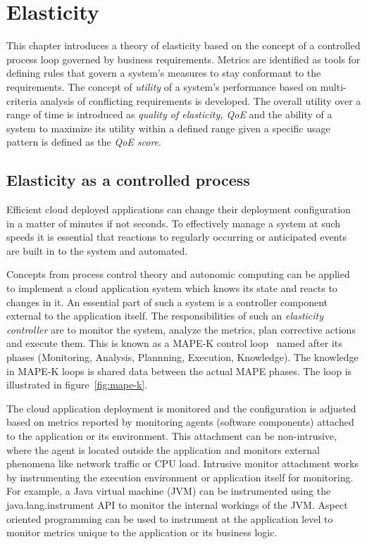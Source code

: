 \documentclass[english]{tktltiki2}
\theoremstyle{definition}
\theoremstyle{remark}
\begin{document}
\section{Elasticity}  
\label{sec:elasticity}

This chapter introduces a theory of elasticity based on the concept of a
controlled process loop governed by business requirements. Metrics are
identified as tools for defining rules that govern a system's measures to stay
conformant to the requirements. The concept of \textit{utility} of a system's
performance based on multi-criteria analysis of conflicting requirements is
developed. The overall utility over a range of time is introduced as
\textit{quality of elasticity, QoE} and the ability of a system to maximize its
utility within a defined range given a specific usage pattern is defined as the
\textit{QoE score}.

\subsection{Elasticity as a controlled process}
\label{sec:elasticity_as_a_controlled_process}

Efficient cloud deployed applications can change their deployment configuration in a matter of minutes if not seconds. To effectively manage a system at such speeds it
is essential that reactions to regularly occurring or anticipated events are
built in to the system and automated.

Concepts from process control theory and autonomic computing can be applied to
implement a cloud application system which knows its state and reacts to changes
in it. An essential part of such a system is a controller component external to
the application itself. The responsibilities of such an \emph{elasticity controller}
are to monitor the system, analyze the metrics, plan corrective actions and
execute them. This is known as a MAPE-K control
loop~\cite{Huebscher2008}\cite{Mueller2009} named after its phases (Monitoring,
Analysis, Plannning, Execution, Knowledge). The knowledge in MAPE-K loops is
shared data between the actual MAPE phases. The loop is illustrated in figure~\ref{fig:mape-k}.

The cloud application deployment is monitored and the configuration is adjusted
based on metrics reported by monitoring agents (software components) attached to
the application or its environment. This attachment can be non-intrusive, where
the agent is located outside the application and monitors external phenomena
like network traffic or CPU load. Intrusive monitor attachment works by
instrumenting the execution environment or application itself for monitoring.
For example, a Java virtual machine (JVM) can be instrumented using the
java.lang.instrument API to monitor the internal workings of the JVM. Aspect
oriented programming can be used to instrument at the application level to
monitor metrics unique to the application or its business logic.
\end{document}
